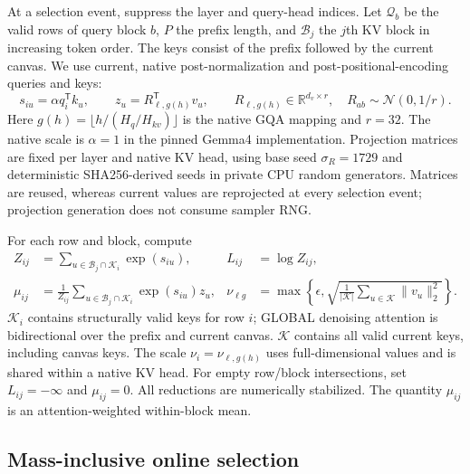 \documentclass[10pt]{article}
\begin{document}
At a selection event, suppress the layer and query-head indices. Let
$\mathcal Q_b$ be the valid rows of query block $b$, $P$ the prefix length,
and $\mathcal B_j$ the $j$th KV block in increasing token order. The keys
consist of the prefix followed by the current canvas. We use current,
native post-normalization and post-positional-encoding queries and keys:
\begin{equation}
 s_{iu}=\alpha q_i^{\mathsf T}k_u,
 \qquad z_u=R_{\ell,g(h)}^{\mathsf T}v_u,
 \qquad R_{\ell,g(h)}\in\mathbb R^{d_v\times r},
 \quad R_{ab}\sim\mathcal N(0,1/r).
 \label{eq:v2-projection}
\end{equation}
Here $g(h)=\lfloor h/(H_q/H_{kv})\rfloor$ is the native GQA mapping and
$r=32$. The native scale is $\alpha=1$ in the pinned Gemma4 implementation.
Projection matrices are fixed per layer and native KV head, using base seed
$\sigma_R=1729$ and deterministic SHA256-derived seeds in private CPU random
generators. Matrices are reused, whereas current values are reprojected at
every selection event; projection generation does not consume sampler RNG.

For each row and block, compute
\begin{align}
 Z_{ij}&=\sum_{u\in\mathcal B_j\cap\mathcal K_i}\exp(s_{iu}),
 & L_{ij}&=\log Z_{ij}, \label{eq:v2-mass}\\
 \mu_{ij}&=\frac{1}{Z_{ij}}
       \sum_{u\in\mathcal B_j\cap\mathcal K_i}\exp(s_{iu})z_u,
 & \nu_{\ell g}&=\max\!\left\{\epsilon,
       \sqrt{\frac{1}{|\mathcal K|}
       \sum_{u\in\mathcal K}\|v_u\|_2^2}\right\}.
 \label{eq:v2-mean-scale}
\end{align}
$\mathcal K_i$ contains structurally valid keys for row $i$; GLOBAL
denoising attention is bidirectional over the prefix and current canvas.
$\mathcal K$ contains all valid current keys, including canvas keys.
The scale $\nu_i=\nu_{\ell,g(h)}$ uses full-dimensional values and is shared
within a native KV head. For empty row/block intersections, set
$L_{ij}=-\infty$ and $\mu_{ij}=0$. All reductions are numerically stabilized.
The quantity $\mu_{ij}$ is an attention-weighted within-block mean.

\subsection{Mass-inclusive online selection}
\label{sec:v2-selection}
\end{document}
